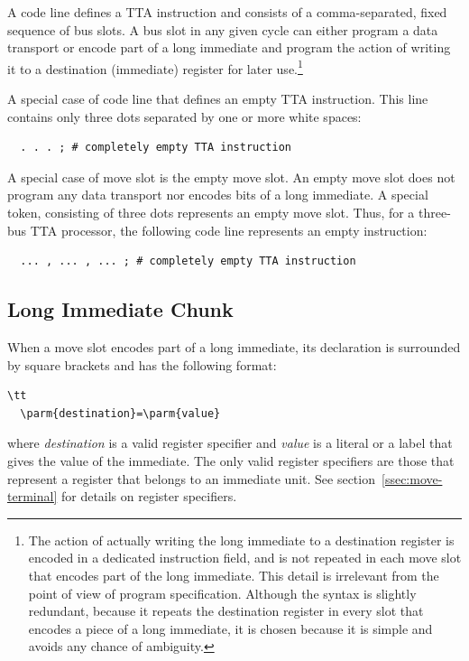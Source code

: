 \documentclass[twoside]{tceusermanual}
\begin{document}
A code line defines a TTA instruction and consists of a comma-separated,
fixed sequence of bus slots.  A bus slot in any given cycle can either
program a data transport or encode part of a long immediate and program the
action of writing it to a destination (immediate) register for later
use.\footnote{
%
  The action of actually writing the long immediate to a destination
  register is encoded in a dedicated instruction field, and is not repeated
  in each move slot that encodes part of the long immediate.  This detail is
  irrelevant from the point of view of program specification.  Although the
  syntax is slightly redundant, because it repeats the destination register
  in every slot that encodes a piece of a long immediate, it is chosen
  because it is simple and avoids any chance of ambiguity.}

A special case of code line that defines an empty TTA instruction. This line
contains only three dots separated by one or more white spaces:
\begin{verbatim}
  . . . ; # completely empty TTA instruction
\end{verbatim}

A special case of move slot is the empty move slot. An empty move slot does
not program any data transport nor encodes bits of a long immediate. A
special token, consisting of three dots represents an empty move slot.
Thus, for a three-bus TTA processor, the following code line represents an
empty instruction:
\begin{verbatim}
  ... , ... , ... ; # completely empty TTA instruction
\end{verbatim}

\subsection{Long Immediate Chunk}

When a move slot encodes part of a long immediate, its declaration is
surrounded by square brackets and has the following format:

\begin{verbatim}\tt
  \parm{destination}=\parm{value}
\end{verbatim}

where \emph{destination} is a valid register specifier and \emph{value} is a
literal or a label that gives the value of the immediate.  The only valid
register specifiers are those that represent a register that belongs to an
immediate unit.  See section~\ref{ssec:move-terminal} for details on
register specifiers.
\end{document}
